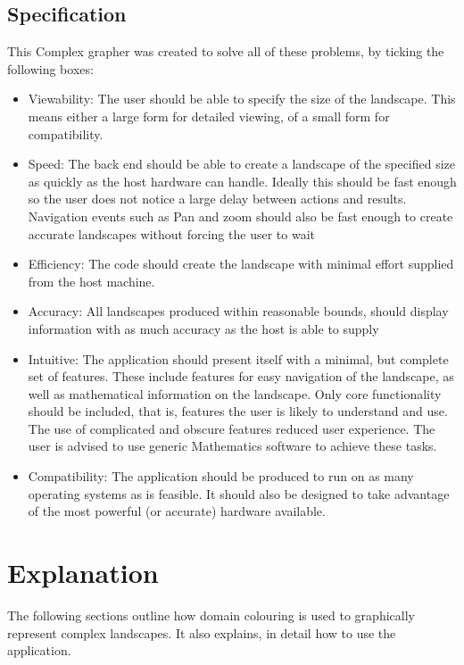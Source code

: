 \documentclass{article}
\begin{document}
		\subsection{Specification}
			This Complex grapher was created to solve all of these problems, by ticking the following boxes:
			
			\begin{itemize}
				\item Viewability: The user should be able to specify the size of the landscape. This means either a large form for detailed viewing, of a small form for compatibility.
				
				\item Speed: The back end should be able to create a landscape of the specified size as quickly as the host hardware can handle. Ideally this should be fast enough so the user does not notice a large delay between actions and results. Navigation events such as Pan and zoom should also be fast enough to create accurate landscapes without forcing the user to wait
				
				\item Efficiency: The code should create the landscape with minimal effort supplied from the host machine.
				
				\item Accuracy: All landscapes produced within reasonable bounds, should display information with as much accuracy as the host
				is able to supply
				
				\item Intuitive: The application should present itself with a minimal, but complete set of features. These include features for easy navigation of the landscape, as well as mathematical information on the landscape. Only core functionality should be included, that is, features the user is likely to understand and use. The use of complicated and obscure features reduced user experience. The user is advised to use generic Mathematics software to achieve these tasks.
				
				\item Compatibility: The application should be produced to run on as many operating systems as is feasible. It should also be designed to take advantage of the most powerful (or accurate) hardware available.
			\end{itemize}
	
	\section{Explanation}
		The following sections outline how domain colouring is used to graphically represent complex landscapes. It also explains, in detail how to use the application.
	
\end{document}

